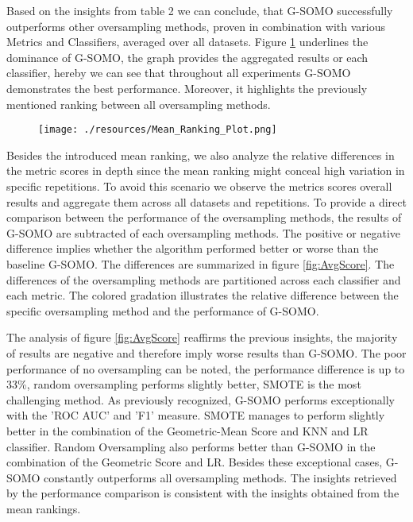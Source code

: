 \documentclass[parskip=full]{scrartcl}
\begin{document}
Based on the insights from table 2 we can conclude, that G-SOMO successfully
outperforms other oversampling methods, proven in combination with various
Metrics and Classifiers, averaged over all datasets. Figure
\ref{fig:MeanRanking} underlines the dominance of G-SOMO, the graph provides the
aggregated results or each classifier, hereby we can see that throughout all
experiments G-SOMO demonstrates the best performance. Moreover, it highlights
the previously mentioned ranking between all oversampling methods. 

\begin{figure}[H]
	\centering
	\texttt{[image: ./resources/Mean\_Ranking\_Plot.png]}
	\label{fig:MeanRanking}
\end{figure}

Besides the introduced mean ranking, we also analyze the relative differences in
the metric scores in depth since the mean ranking might conceal high variation
in specific repetitions. To avoid this scenario we observe the metrics scores
overall results and aggregate them across all datasets and repetitions. To
provide a direct comparison between the performance of the oversampling methods,
the results of G-SOMO are subtracted of each oversampling methods. The positive
or negative difference implies whether the algorithm performed better or worse
than the baseline G-SOMO. The differences are summarized in figure
\ref{fig:AvgScore}. The differences of the oversampling methods are partitioned
across each classifier and each metric. The colored gradation illustrates the
relative difference between the specific oversampling method and the performance
of G-SOMO.

The analysis of figure \ref{fig:AvgScore} reaffirms the previous insights, the
majority of results are negative and therefore imply worse results than G-SOMO.
The poor performance of no oversampling can be noted, the performance difference
is up to 33\%, random oversampling performs slightly better, SMOTE is the most
challenging method. As previously recognized, G-SOMO performs exceptionally with
the 'ROC AUC' and 'F1' measure. SMOTE manages to perform slightly better in the
combination of the Geometric-Mean Score and KNN and LR classifier. Random
Oversampling also performs better than G-SOMO in the combination of the
Geometric Score and LR. Besides these exceptional cases, G-SOMO constantly
outperforms all oversampling methods. The insights retrieved by the performance
comparison is consistent with the insights obtained from the mean rankings. 
\end{document}
